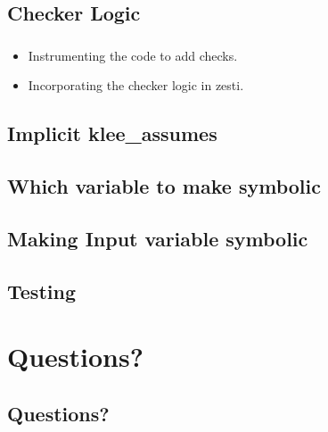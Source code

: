 \documentclass[mathserif,10pt]{beamer}
\newcommand{\cmt}[1]{}
\begin{document}
\subsection{Checker Logic}
\frame
{
  \frametitle{\subsecname}
  \begin{itemize}
    \item Instrumenting the code to add checks. 
    \item Incorporating the checker logic in zesti.
    \cmt{
    This prevents zesti from interpreting the checker code (as now the checker code will be a part of the symbolic execution engine). 
    With this the run time performance is expected to improve.
      To mitigate the path explosion problem, ZESTI carefully chooses divergent
        paths via two mechanisms: (1) it only diverges close to sensitive
        instructions (memory accesses and divisions.), i.e instructions that
        might contain a bug, and (2) it chooses the divergence points in order
        of increasing distance from the sensitive instruction. The key idea
        behind this approach is to exercise sensitive instructions on slightly
        different paths, with the goal of triggering a bug if the respective
        instructions contain one.  ZESTI identifies sensitive instructions
        dynamically while running the concrete input.  
    } 
  \end{itemize} 
}

\subsection{Implicit klee\_assumes}
\frame
{
  \frametitle{\subsecname}

}

\subsection{Which variable to make symbolic}
\frame
{
  \frametitle{\subsecname}

}

\subsection{Making Input variable symbolic}
\frame
{
  \frametitle{\subsecname}
  \lstI

}

\subsection{Testing}
\frame
{
  \frametitle{\subsecname}

}

\section{Questions?}
\subsection{Questions?}
\frame
{}
\end{document}
